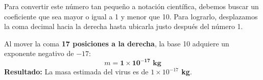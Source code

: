 \documentclass[12pt]{article}
\begin{document}
\begin{tcolorbox}
\begin{center}
\begin{tikzpicture}[scale=1]
    \end{tikzpicture}
    \end{center}

    \vspace{0.4cm}
    \begin{tcolorbox}[colback=medteal!10, colframe=medteal, arc=2mm, boxrule=1.2pt, title=\textbf{Desarrollo Matemático y Solución}]
        Para convertir este número tan pequeño a notación científica, debemos buscar un coeficiente que sea mayor o igual a 1 y menor que 10. Para lograrlo, desplazamos la coma decimal hacia la derecha hasta ubicarla justo después del número 1.
        
        Al mover la coma \textbf{17 posiciones a la derecha}, la base 10 adquiere un exponente negativo de \textbf{$-17$}:
        \[ m = \mathbf{1 \times 10^{-17} \text{ kg}} \]
        \textbf{Resultado:} La masa estimada del virus es de \textbf{$1 \times 10^{-17}$ kg}.
    \end{tcolorbox}
    
\end{tcolorbox}
\end{document}
